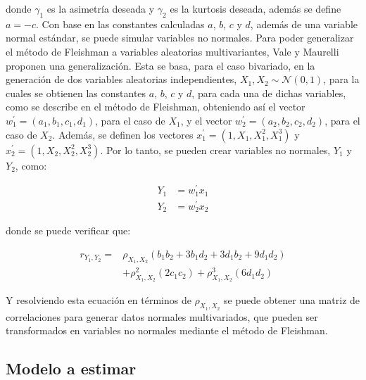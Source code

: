 \documentclass[
]{article}
\begin{document}
donde \(\gamma_1\) es la asimetría deseada y \(\gamma_2\) es la kurtosis
deseada, además se define \(a = -c\). Con base en las constantes
calculadas \(a\), \(b\), \(c\) y \(d\), además de una variable normal
estándar, se puede simular variables no normales. Para poder generalizar
el método de Fleishman a variables aleatorias multivariantes, Vale y
Maurelli proponen una generalización. Esta se basa, para el caso
bivariado, en la generación de dos variables aleatorias independientes,
\(X_1, X_2 \sim \mathcal{N} (0,1)\), para la cuales se obtienen las
constantes \(a\), \(b\), \(c\) y \(d\), para cada una de dichas
variables, como se describe en el método de Fleishman, obteniendo así el
vector \(w^\prime_1 = (a_1, b_1, c_1, d_1)\), para el caso de \(X_1\), y
el vector \(w^\prime_2 = (a_2, b_2, c_2, d_2)\), para el caso de
\(X_2\). Además, se definen los vectores
\(x_1^\prime = (1, X_1, X_1^2, X_1^3)\) y
\(x_2^\prime = (1, X_2, X_2^2, X_2^3)\). Por lo tanto, se pueden crear
variables no normales, \(Y_1\) y \(Y_2\), como:

\begin{align*}
  Y_1 & = w_1^\prime x_1 \\
  Y_2 & = w_2^\prime x_2
\end{align*}

donde se puede verificar que:

\begin{align*}
  r_{Y_1, Y_2} = & \rho_{X_1, X_2} (b_1 b_2 + 3b_1 d_2 + 3d_1 b_2 + 9 d_1 d_2) \\
  & + \rho_{X_1, X_2}^2 (2 c_1 c_2) + \rho_{X_1, X_2}^3 (6 d_1 d_2)
\end{align*}

Y resolviendo esta ecuación en términos de \(\rho_{X_1, X_2}\) se puede
obtener una matriz de correlaciones para generar datos normales
multivariados, que pueden ser transformados en variables no normales
mediante el método de Fleishman.

\subsection{Modelo a estimar}
\end{document}
